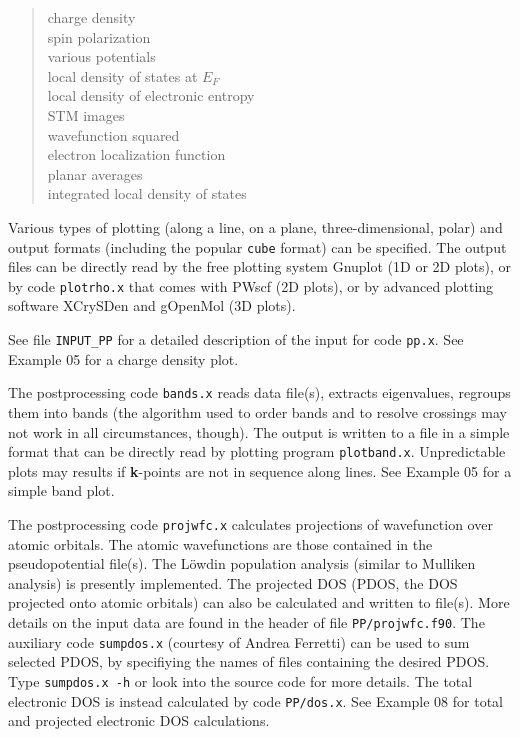\documentclass[12pt,a4paper]{article}
\begin{document}
\begin{quote}
  charge density\\
  spin polarization\\
  various potentials\\
  local density of states at $E_F$\\
  local density of electronic entropy\\
  STM images\\
  wavefunction squared\\
  electron localization function\\
  planar averages\\
  integrated local density of states
\end{quote}
Various types of plotting (along a line, on a plane, three-dimensional,
polar) and output formats (including the popular {\tt cube} format) can
be specified. The output files can be directly read by the free plotting
system Gnuplot (1D or 2D plots), 
or by code \texttt{plotrho.x} that comes with PWscf (2D plots), or 
by advanced plotting software XCrySDen and gOpenMol (3D plots).

See file \texttt{INPUT\_PP} for a detailed description of the input
for code \texttt{pp.x}.
See Example 05 for a charge density plot.

The postprocessing code \texttt{bands.x} reads data file(s), extracts
eigenvalues, regroups them into bands (the algorithm used to order
bands and to resolve crossings may not work in all circumstances,
though).
The output is written to a file in a simple format that can be
directly read by plotting program \texttt{plotband.x}.
Unpredictable plots may results if \textbf{k}-points are not in
sequence along lines.
See Example 05 for a simple band plot.

The postprocessing code \texttt{projwfc.x} calculates projections of
wavefunction over atomic orbitals.
The atomic wavefunctions are those contained in the pseudopotential
file(s).
The L\"owdin population analysis (similar to Mulliken analysis) is
presently implemented.
The projected DOS (PDOS, the DOS projected onto atomic orbitals) can 
also be calculated and written to file(s).
More details on the input data are found in the header of file
\texttt{PP/projwfc.f90}. The auxiliary code \texttt{sumpdos.x}
(courtesy of Andrea Ferretti) can be used to sum selected PDOS, 
by specifiying the names of files containing the desired PDOS.
Type \texttt{sumpdos.x -h} or look into the source code for
more details.
The total electronic DOS is instead calculated by code
\texttt{PP/dos.x}.
See Example 08 for total and projected electronic DOS calculations.
\end{document}
